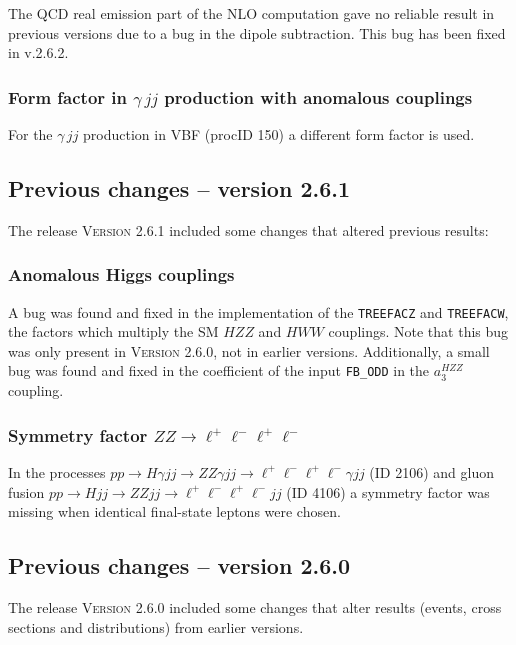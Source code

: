 \documentclass[english,12pt]{article}
\begin{document}
The QCD real emission part of the NLO computation gave no reliable result in previous versions
due to a bug in the dipole subtraction. This bug has been fixed in v.2.6.2.

\subsubsection{Form factor in $\gamma\,jj$ production with anomalous couplings}

 For the $\gamma\,jj$ production in VBF (procID 150) a different form factor is used.


\subsection{Previous changes -- version 2.6.1}

The release \textsc{Version 2.6.1} included some changes that altered previous results:

\subsubsection{Anomalous Higgs couplings}

A bug was found and fixed in the implementation of the {\tt TREEFACZ} and {\tt TREEFACW}, 
the factors which multiply the SM $HZZ$ and $HWW$ couplings.  Note that this bug was only 
present in \textsc{Version 2.6.0}, not in earlier versions.  Additionally, a small bug was 
found and fixed in the coefficient of the input {\tt FB\_ODD} in the $a_{3}^{HZZ}$ coupling.

\subsubsection{Symmetry factor $ZZ \rightarrow \ell^{+} \ell^{-} \ell^{+} \ell^{-}$ }

In the processes $pp \rightarrow H \gamma jj \rightarrow ZZ \gamma jj \rightarrow \ell^{+} 
\ell^{-} \ell^{+} \ell^{-} \gamma jj$ (ID 2106) and gluon fusion $pp \rightarrow H jj \rightarrow 
ZZ jj \rightarrow \ell^{+} \ell^{-} \ell^{+} \ell^{-} jj $ (ID 4106) a symmetry factor was missing 
when identical final-state leptons were chosen.


\subsection{Previous changes -- version 2.6.0}

The release \textsc{Version 2.6.0} included some changes 
that alter results (events, cross sections and distributions) from earlier versions.
\end{document}
